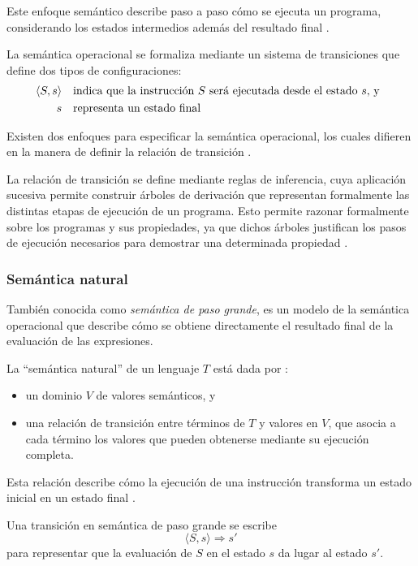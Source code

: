 Este enfoque semántico describe paso a paso cómo se ejecuta un programa, considerando los estados intermedios además del resultado final \cite{nielson1992semantics}.

La semántica operacional se formaliza mediante un sistema de transiciones que define dos tipos de configuraciones:
\[
\begin{aligned}
\langle S, s \rangle &\quad \parbox[t]{0.8\columnwidth}{%
indica que la instrucción $S$ será ejecutada desde el estado $s$, y} \\
s &\quad \text{representa un estado final}
\end{aligned}
\]


Existen dos enfoques para especificar la semántica operacional, los cuales difieren en la manera de definir la relación de transición \cite{nielson1992semantics}. 

La relación de transición se define mediante reglas de inferencia, cuya aplicación sucesiva permite construir árboles de derivación que representan formalmente las distintas etapas de ejecución de un programa. Esto permite razonar formalmente sobre los programas y sus propiedades, ya que dichos árboles justifican los pasos de ejecución necesarios para demostrar una determinada propiedad \cite{nielson1992semantics}.

\subsubsection{Semántica natural}

También conocida como \emph{semántica de paso grande}, es un modelo de la semántica operacional que describe cómo se obtiene directamente el resultado final de la evaluación de las expresiones. 

La \enquote{semántica natural} de un lenguaje $T$ está dada por \cite{hutton2023semantics}:
\begin{itemize}
    \item un dominio $V$ de valores semánticos, y
    \item una relación de transición entre términos de $T$ y valores en $V$, que asocia a cada término los valores que pueden obtenerse mediante su ejecución completa. 
\end{itemize}

Esta relación describe cómo la ejecución de una instrucción transforma un estado inicial en un estado final \cite{nielson1992semantics}. 

Una transición en semántica de paso grande se escribe
\[
\langle S, s \rangle \Rightarrow s'
\]
para representar que la evaluación de $S$ en el estado $s$ da lugar al estado $s'$. 

